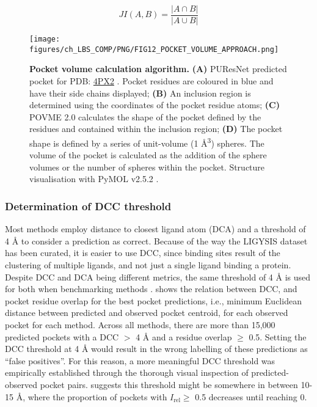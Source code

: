 \begin{equation}
JI(A, B) = \frac{|A \cap B|}{|A \cup B|}
\label{eq:jaccard_index}
\end{equation}

\begin{figure}[h]
    \centering
    \texttt{[image: figures/ch\_LBS\_COMP/PNG/FIG12\_POCKET\_VOLUME\_APPROACH.png]}
    \caption[Pocket volume calculation algorithm]{\textbf{Pocket volume calculation algorithm.} \textbf{(A)} PUResNet predicted pocket for PDB: \href{https://www.ebi.ac.uk/pdbe/entry/pdb/4PX2}{4PX2} \cite{PDB_4PX2}. Pocket residues are coloured in blue and have their side chains displayed; \textbf{(B)} An inclusion region is determined using the coordinates of the pocket residue atoms; \textbf{(C)} POVME 2.0 calculates the shape of the pocket defined by the residues and contained within the inclusion region; \textbf{(D)} The pocket shape is defined by a series of unit-volume (1 \AA{}\textsuperscript{3}) spheres. The volume of the pocket is calculated as the addition of the sphere volumes or the number of spheres within the pocket. Structure visualisation with PyMOL v2.5.2 \cite{SCHRODINGER_2015_PYMOL}.}
    \label{fig:protein_volume_approach}
\end{figure}

\subsubsection{Determination of DCC threshold}

Most methods employ distance to closest ligand atom  (DCA) and a threshold of 4 \AA{} to consider a prediction as correct. Because of the way the LIGYSIS dataset has been curated, it is easier to use DCC, since binding sites result of the clustering of multiple ligands, and not just a single ligand binding a protein. Despite DCC and DCA being different metrics, the same threshold of 4 \AA{} is used for both when benchmarking methods \cite{AGGARWAL_2022_DEEPPOCKET, SESTAK_2024_VNEGNN, KANDEL_2021_PURESNET}.  shows the relation between DCC, and pocket residue overlap for the best pocket predictions, i.e., minimum Euclidean distance between predicted and observed pocket centroid, for each observed pocket for each method. Across all methods, there are more than 15,000 predicted pockets with a DCC $>$ 4 \AA{} and a residue overlap $\geq$ 0.5. Setting the DCC threshold at 4 \AA{} would result in the wrong labelling of these predictions as ``false positives''. For this reason, a more meaningful DCC threshold was empirically established through the thorough visual inspection of predicted-observed pocket pairs.  suggests this threshold might be somewhere in between 10-15 \AA{}, where the proportion of pockets with $I_{\text{rel}} \geq$ 0.5 decreases until reaching 0.

